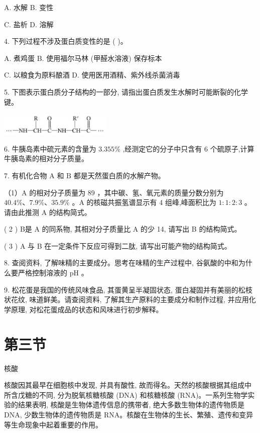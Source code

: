 \documentclass[10pt]{article}
\begin{document}
A. 水解 B. 变性

C. 盐析 D. 溶解

4. 下列过程不涉及蛋白质变性的是 ( )。

A. 煮鸡蛋 B. 使用福尔马林 (甲醛水溶液) 保存标本

C. 以粮食为原料酿酒 D. 使用医用酒精、紫外线杀菌消毒

5. 下图表示蛋白质分子结构的一部分, 请指出蛋白质发生水解时可能断裂的化学键。

\begin{center}
\includegraphics[max width=0.4\textwidth]{images/0190efc5-b58a-7c43-bfb0-e0a030df9cfd_126_539509.jpg}
\end{center}

6. 牛胰岛素中硫元素的含量为 \({3.355}\%\) ,经测定它的分子中只含有 6 个硫原子,计算牛胰岛素的相对分子质量。

7. 有机化合物 \(\mathrm{A}\) 和 \(\mathrm{B}\) 都是天然蛋白质的水解产物。

（1）A 的相对分子质量为 89 ，其中碳、氢、氧元素的质量分数分别为 \({40.4}\% \text{、}{7.9}\% \text{、}{35.9}\%\) 。A 的核磁共振氢谱显示有 4 组峰,峰面积比为 \(1 : 1 : 2 : 3\) 。请由此推测 \(\mathrm{A}\) 的结构简式。

( 2 ) B是 A 的同系物, 其相对分子质量比 A 的少 14, 请写出 B 的结构简式。

( 3 ) A 与 B 在一定条件下反应可得到二肽, 请写出可能产物的结构简式。

8. 查阅资料, 了解味精的主要成分。思考在味精的生产过程中, 谷氨酸的中和为什么要严格控制溶液的 \(\mathrm{{pH}}\) 。

9. 松花蛋是我国的传统风味食品, 其蛋黄呈半凝固状态, 蛋白凝固并有美丽的松枝状花纹, 味道鲜美。请查阅资料, 了解其生产原料的主要成分和制作过程, 并应用化学原理, 对松花蛋成品的状态和风味进行初步解释。

\section*{第三节}

核酸

核酸因其最早在细胞核中发现, 并具有酸性, 故而得名。天然的核酸根据其组成中所含戊糖的不同, 分为脱氧核糖核酸 (DNA) 和核糖核酸 (RNA)。一系列生物学实验的结果表明, 核酸是生物体遗传信息的携带者, 绝大多数生物体的遗传物质是 DNA, 少数生物体的遗传物质是 RNA。核酸在生物体的生长、繁殖、遗传和变异等生命现象中起着重要的作用。
\end{document}
